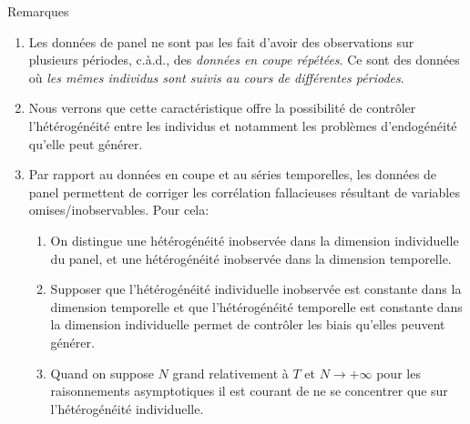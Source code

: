 \begin{frame}[allowframebreaks]{Remarques}
\framebreak

\begin{remark_fr}
\begin{enumerate}[$\star$]
    \item Les données de panel ne sont pas les fait d'avoir des observations sur plusieurs périodes, 
    c.à.d., des 
    \emph{données en coupe répétées}. Ce sont des données où \emph{les mêmes individus 
    sont suivis au cours de différentes périodes}.  
    \item Nous verrons que cette caractéristique offre la possibilité de contrôler 
    l'hétérogénéité entre les individus et notamment les problèmes d'endogénéité 
    qu'elle peut générer. 
    \item Par rapport au données en coupe et au séries temporelles, les données de panel 
    permettent de corriger les corrélation fallacieuses résultant de variables omises/inobservables.
     Pour cela:
    \begin{enumerate}[-]
        \item On distingue une hétérogénéité inobservée dans la dimension individuelle du panel, 
        et une hétérogénéité inobservée dans la dimension temporelle. 
        \item Supposer que l'hétérogénéité individuelle inobservée est constante 
        dans la dimension temporelle et que l'hétérogénéité temporelle 
        est constante dans la dimension individuelle permet de contrôler 
        les biais qu'elles peuvent générer.
        \item Quand on suppose $N$ grand relativement à $T$ et $N\rightarrow +\infty$ pour les raisonnements
        asymptotiques il est courant de ne se concentrer que sur l'hétérogénéité individuelle.
    \end{enumerate}
\end{enumerate}
\end{remark_fr}
\end{frame}

